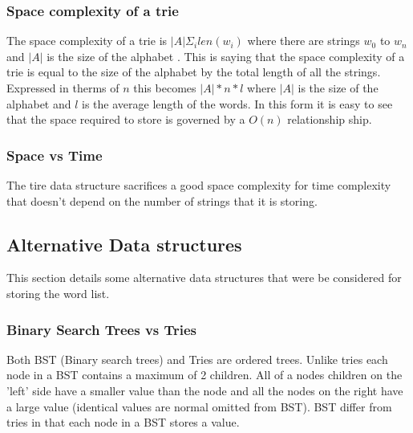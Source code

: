 \documentclass[10pt]{article} %
\begin{document}
			\subsubsection{Space complexity of a trie}
			    The space complexity of a trie is \begin{math} \vert A \vert \Sigma_i len(w_i)\end{math} where there are strings \begin{math} w_0 \end{math} to \begin{math} w_n \end{math} and \begin{math}\vert A \vert \end{math} is the size of the alphabet \cite{book:ADS:complexity}.
			    This is saying that the space complexity of a trie is equal to the size of the alphabet by the total length of all the strings.
			    Expressed in therms of \begin{math} n \end{math} this becomes \begin{math} \vert A \vert * n * l \end{math} where \begin{math}\vert A \vert \end{math} is the size of the alphabet and \begin{math} l \end{math} is the average length of the words.
			    In this form it is easy to see that the space required to store is governed by a  \begin{math} O(n) \end{math} relationship ship.
			    
            \subsubsection{Space vs Time}
                The tire data structure sacrifices a good space complexity for time complexity that doesn't depend on the number of strings that it is storing. 
                
		\subsection{Alternative Data structures}
		    This section details some alternative data structures that were be considered for storing the word list.
		    
			\subsubsection{Binary Search Trees vs Tries}
			    Both BST (Binary search trees) and Tries are ordered trees.
			    Unlike tries each node in a BST contains a maximum of 2 children. All of a nodes children on the 'left' side have a smaller value than the node and all the nodes on the right have a large value (identical values are normal omitted from BST). BST differ from tries in that each node in a BST stores a value.
			    
\end{document}
